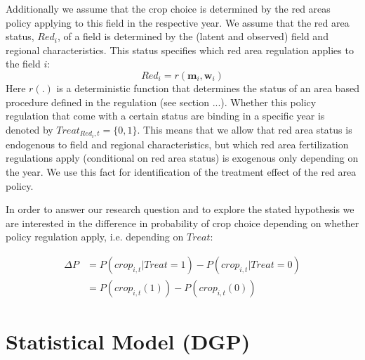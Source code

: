 \documentclass{article}
\begin{document}
Additionally we assume that the 
crop choice is determined by the red areas policy applying to this field in the respective year.
We assume that the red area status, $Red_i$, of a field is determined by the (latent and observed)
field and regional characteristics. This status specifies which red area regulation applies to the 
field $i$:
\begin{equation}  
    Red_{i} = r(\mathbf{m}_i,\mathbf{w}_i)
\end{equation}
Here $r(.)$ is a deterministic function that determines the status of an area
based procedure defined in the regulation (see section ...). 
Whether this policy regulation that come with a certain status are binding 
in a specific year is denoted by $Treat_{Red_i,t}=\{0,1\}$. This means that
we allow that red area status is endogenous to field and regional characteristics, but which 
red area fertilization regulations apply (conditional on red area status) is exogenous 
only depending on the year. 
We use this fact for identification of the treatment effect of the red area policy. 

\par

In order to answer our research question and to explore the stated hypothesis 
we are interested in the difference in probability of crop choice
depending on whether policy regulation apply, i.e. depending on $Treat$:

\begin{equation} 
\begin{aligned}
    \Delta P &= P(crop_{i,t}|Treat=1)-P(crop_{i,t}|Treat=0) \\
    &= P(crop_{i,t}(1))-P(crop_{i,t}(0))
\end{aligned}
\end{equation}


\section{Statistical Model (DGP)}
\end{document}
